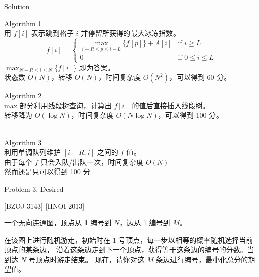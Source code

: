 \documentclass[UTF8]{beamer}
\begin{document}
\begin{frame}{Solution}

\begin{itemize}
     {\item Algorithm 1 \\
        用 $f[i]$ 表示跳到格子 $i$ 并停留所获得的最大冰冻指数。
        \pause
        \begin{equation*}
            f[i] =
            \begin{cases}
                \max_{i-R \leq p \leq i-L} \{ f[p] \} + A[i] &\mbox{if $i \geq L$} \\
                0   &\mbox{if $0 \leq i \le L$}
            \end{cases}
        \end{equation*}
        \pause
        $\max_{N-R \leq i \leq N} \{ f[i] \}$ 即为答案。 \\
        \pause
        状态数 $O(N)$，转移 $O(N)$，时间复杂度 $O(N^2)$，可以得到 60 分。}
     { {\item Algorithm 2 \\
        max 部分利用线段树查询，计算出 $f[i]$ 的值后直接插入线段树。 \\
        转移降为 $O(\log N)$，时间复杂度 $O(N \log N)$，可以得到 100 分。 \\　}}
     {\item Algorithm 3 \\
        利用单调队列维护 $[i-R, i]$ 之间的 $f$ 值。 \\
        由于每个 $f$ 只会入队/出队一次，时间复杂度 $O(N)$ \\然而还是只可以得到 100 分}
\end{itemize}

\end{frame}


\begin{frame}{Problem 3. Desired}

[BZOJ 3143] [HNOI 2013]

一个无向连通图，顶点从 1 编号到 $N$，边从 1 编号到 $M$。

在该图上进行随机游走，初始时在 1 号顶点，每一步以相等的概率随机选择当前顶点的某条边，
沿着这条边走到下一个顶点，获得等于这条边的编号的分数。当到达 $N$ 号顶点时游走结束。
现在，请你对这 $M$ 条边进行编号，最小化总分的期望值。

\end{frame}
\end{document}
